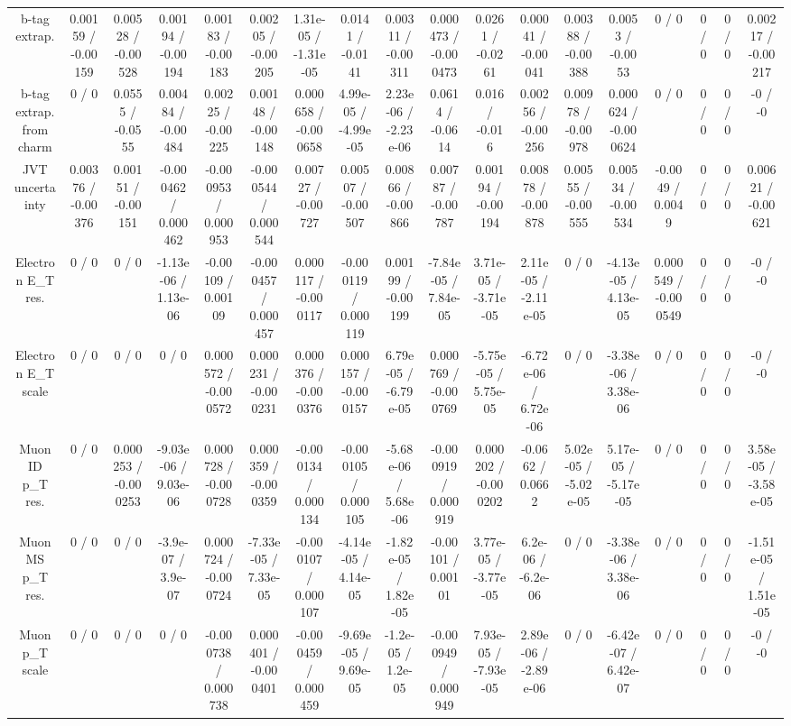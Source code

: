 \documentclass[10pt]{article}
\begin{document}
\begin{table}[htbp]
\begin{center}
\begin{tabular}{|c|c|c|c|c|c|c|c|c|c|c|c|c|c|c|c|c|c|}
  b-tag extrap. & 0.00159 / -0.00159 & 0.00528 / -0.00528 & 0.00194 / -0.00194 & 0.00183 / -0.00183 & 0.00205 / -0.00205 & 1.31e-05 / -1.31e-05 & 0.0141 / -0.0141 & 0.00311 / -0.00311 & 0.000473 / -0.000473 & 0.0261 / -0.0261 & 0.00041 / -0.00041 & 0.00388 / -0.00388 & 0.0053 / -0.0053 & 0 / 0 & 0 / 0 & 0 / 0 & 0.00217 / -0.00217 \\ 
  b-tag extrap. from charm & 0 / 0 & 0.0555 / -0.0555 & 0.00484 / -0.00484 & 0.00225 / -0.00225 & 0.00148 / -0.00148 & 0.000658 / -0.000658 & 4.99e-05 / -4.99e-05 & 2.23e-06 / -2.23e-06 & 0.0614 / -0.0614 & 0.016 / -0.016 & 0.00256 / -0.00256 & 0.00978 / -0.00978 & 0.000624 / -0.000624 & 0 / 0 & 0 / 0 & 0 / 0 & -0 / -0 \\ 
  JVT uncertainty & 0.00376 / -0.00376 & 0.00151 / -0.00151 & -0.000462 / 0.000462 & -0.000953 / 0.000953 & -0.000544 / 0.000544 & 0.00727 / -0.00727 & 0.00507 / -0.00507 & 0.00866 / -0.00866 & 0.00787 / -0.00787 & 0.00194 / -0.00194 & 0.00878 / -0.00878 & 0.00555 / -0.00555 & 0.00534 / -0.00534 & -0.0049 / 0.0049 & 0 / 0 & 0 / 0 & 0.00621 / -0.00621 \\ 
  Electron E_{T} res. & 0 / 0 & 0 / 0 & -1.13e-06 / 1.13e-06 & -0.00109 / 0.00109 & -0.000457 / 0.000457 & 0.000117 / -0.000117 & -0.000119 / 0.000119 & 0.00199 / -0.00199 & -7.84e-05 / 7.84e-05 & 3.71e-05 / -3.71e-05 & 2.11e-05 / -2.11e-05 & 0 / 0 & -4.13e-05 / 4.13e-05 & 0.000549 / -0.000549 & 0 / 0 & 0 / 0 & -0 / -0 \\ 
  Electron E_{T} scale & 0 / 0 & 0 / 0 & 0 / 0 & 0.000572 / -0.000572 & 0.000231 / -0.000231 & 0.000376 / -0.000376 & 0.000157 / -0.000157 & 6.79e-05 / -6.79e-05 & 0.000769 / -0.000769 & -5.75e-05 / 5.75e-05 & -6.72e-06 / 6.72e-06 & 0 / 0 & -3.38e-06 / 3.38e-06 & 0 / 0 & 0 / 0 & 0 / 0 & -0 / -0 \\ 
  Muon ID p_{T} res. & 0 / 0 & 0.000253 / -0.000253 & -9.03e-06 / 9.03e-06 & 0.000728 / -0.000728 & 0.000359 / -0.000359 & -0.000134 / 0.000134 & -0.000105 / 0.000105 & -5.68e-06 / 5.68e-06 & -0.000919 / 0.000919 & 0.000202 / -0.000202 & -0.0662 / 0.0662 & 5.02e-05 / -5.02e-05 & 5.17e-05 / -5.17e-05 & 0 / 0 & 0 / 0 & 0 / 0 & 3.58e-05 / -3.58e-05 \\ 
  Muon MS p_{T} res. & 0 / 0 & 0 / 0 & -3.9e-07 / 3.9e-07 & 0.000724 / -0.000724 & -7.33e-05 / 7.33e-05 & -0.000107 / 0.000107 & -4.14e-05 / 4.14e-05 & -1.82e-05 / 1.82e-05 & -0.00101 / 0.00101 & 3.77e-05 / -3.77e-05 & 6.2e-06 / -6.2e-06 & 0 / 0 & -3.38e-06 / 3.38e-06 & 0 / 0 & 0 / 0 & 0 / 0 & -1.51e-05 / 1.51e-05 \\ 
  Muon p_{T} scale & 0 / 0 & 0 / 0 & 0 / 0 & -0.000738 / 0.000738 & 0.000401 / -0.000401 & -0.000459 / 0.000459 & -9.69e-05 / 9.69e-05 & -1.2e-05 / 1.2e-05 & -0.000949 / 0.000949 & 7.93e-05 / -7.93e-05 & 2.89e-06 / -2.89e-06 & 0 / 0 & -6.42e-07 / 6.42e-07 & 0 / 0 & 0 / 0 & 0 / 0 & -0 / -0 \\ 

\end{tabular}
\end{center}
\end{table}
\end{document}
